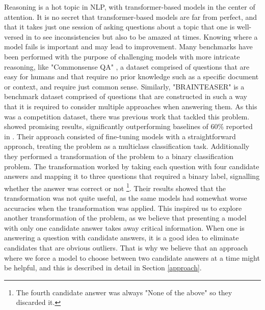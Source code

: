 Reasoning is a hot topic in NLP, with transformer-based models in the center of attention.
It is no secret that transformer-based models are far from perfect, and that it takes just one session of asking questions about a topic that one is well-versed in to see inconsistencies but also to be amazed at times.
Knowing where a model fails is important and may lead to improvement.  Many benchmarks have been performed with the purpose of challenging models with more intricate reasoning, like "Commonsense QA" \citep{commonsenseQA}, a dataset comprised of questions that are easy for humans and that require no prior knowledge such as a specific document or context, and require just common sense.
Similarly, "BRAINTEASER" \citep{semeval} is a benchmark dataset comprised of questions that are constructed in such a way that it is required to consider multiple approaches when answering them.
As this was a competition dataset, there was previous work that tackled this problem.
\citet{ails-lab} showed promising results, significantly outperforming baselines of 60\% reported in \citep{semeval}.
Their approach consisted of fine-tuning models with a straightforward approach, treating the problem as a multiclass classification task. Additionally they performed a transformation of the problem to a binary classification problem. 
The transformation worked by taking each question with four candidate answers and mapping it to three questions that required a binary label, signalling whether the answer was correct or not \footnote[1]{The fourth candidate answer was always "None of the above" so they discarded it.}.
Their results showed that the transformation was not quite useful, as the same models had somewhat worse accuracies when the transformation was applied.  
This inspired us to explore another transformation of the problem, as we believe that presenting a model with only one candidate answer takes away critical information.
When one is answering a question with candidate answers, it is a good idea to eliminate candidates that are obvious outliers.
That is why we believe that an approach where we force a model to choose between two candidate answers at a time might be helpful, and this is described in detail in Section \ref{approach}.